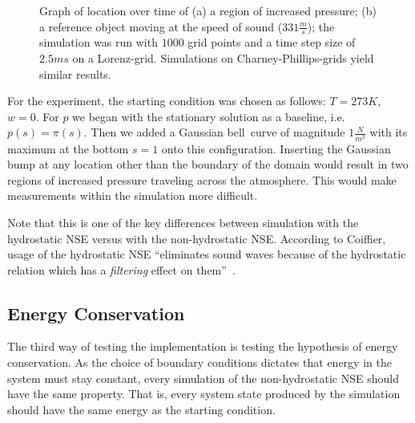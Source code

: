 \begin{figure}[!h]
    \caption{Graph of location over time of (a) a region of increased pressure; (b) a reference object moving at the speed of sound ($331\frac{m}{s}$);
    the simulation was run with $1000$ grid points and a time step size of $2.5ms$ on a Lorenz-grid. Simulations on Charney-Phillips-grids yield similar results.}
    \label{fig:sound_speed}
\end{figure}

For the experiment, the starting condition was chosen as follows: $T=273K$, $w=0$.
For $p$ we began with the stationary solution as a baseline, i.e. $p(s)=\pi (s)$.
Then we added a Gaussian bell~curve of magnitude $1\frac{N}{m^2}$ with its maximum at the bottom $s=1$ onto this configuration.
Inserting the Gaussian bump at any location other than the boundary of the domain would result in two regions of increased pressure traveling across the atmosphere.
This would make measurements within the simulation more difficult.

Note that this is one of the key differences between simulation with the hydrostatic NSE versus with the non-hydrostatic NSE.
According to Coiffier, usage of the hydrostatic NSE ``eliminates sound waves because of the hydrostatic relation which has a \emph{filtering} effect on them''~\cite{coiffier2011fundamentals}.

\subsection{Energy Conservation}\label{sec:energy_conservation_test}
The third way of testing the implementation is testing the hypothesis of energy conservation.
As the choice of boundary conditions dictates that energy in the system must stay constant, every simulation of the non-hydrostatic NSE should have the same property.
That is, every system state produced by the simulation should have the same energy as the starting condition.

